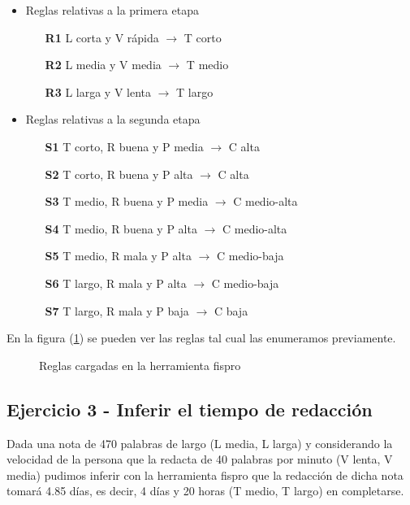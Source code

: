 \documentclass{article}
\begin{document}
\begin{itemize}
\begin{itemize}
	\item Reglas relativas a la primera etapa
	\begin{itemize}
		\item [\textbf{R1}] L corta y V rápida $\rightarrow$ T corto
		\item [\textbf{R2}] L media y V media $\rightarrow$ T medio
		\item [\textbf{R3}] L larga y V lenta $\rightarrow$ T largo
	\end{itemize}
	\item Reglas relativas a la segunda etapa
	\begin{itemize}
		\item [\textbf{S1}] T corto, R buena y P media $\rightarrow$ C alta
		\item [\textbf{S2}] T corto, R buena y P alta $\rightarrow$ C alta
		\item [\textbf{S3}] T medio, R buena y P media $\rightarrow$ C medio-alta
		\item [\textbf{S4}] T medio, R buena y P alta $\rightarrow$ C medio-alta
		\item [\textbf{S5}] T medio, R mala y P alta $\rightarrow$ C medio-baja
		\item [\textbf{S6}] T largo, R mala y P alta $\rightarrow$ C medio-baja
		\item [\textbf{S7}]T largo, R mala y P baja $\rightarrow$ C baja
	\end{itemize}
\end{itemize}

En la figura (\ref{fig:reglas}) se pueden ver las reglas tal cual las enumeramos previamente.

\begin{figure}[H]
	\centering
	\caption{Reglas cargadas en la herramienta fispro}
	\label{fig:reglas}
\end{figure}

\subsection*{Ejercicio 3 - Inferir el tiempo de redacción}
Dada una nota de 470 palabras de largo (L media, L larga) y considerando la velocidad de la persona que la redacta de 40 palabras por minuto (V lenta, V media) pudimos inferir con la herramienta fispro que la redacción de dicha nota tomará 4.85 días, es decir, 4 días y 20 horas (T medio, T largo) en completarse.


\end{itemize}
\end{document}
